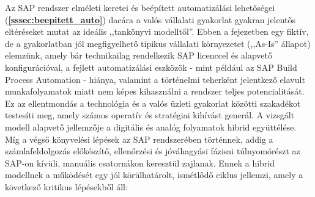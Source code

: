 Az SAP rendszer elméleti keretei és beépített automatizálási lehetőségei (\textbf{\ref{sssec:beepitett_auto}}) dacára a valós vállalati gyakorlat gyakran jelentős eltéréseket mutat az ideális ,,tankönyvi modelltől''.
Ebben a fejezetben egy fiktív, de a gyakorlatban jól megfigyelhető tipikus vállalati környezetet (,,As-Is'' állapot) elemzünk, amely bár technikailag rendelkezik SAP licenccel és alapvető konfigurációval, a fejlett automatizálási eszközök - mint például az SAP Build Process Automation - hiánya, valamint a történelmi teherként jelentkező elavult munkafolyamatok miatt nem képes kihasználni a rendszer teljes potencialitását.
Ez az ellentmondás a technológia és a valós üzleti gyakorlat közötti szakadékot testesíti meg, amely számos operatív és stratégiai kihívást generál.
A vizsgált modell alapvető jellemzője a digitális és analóg folyamatok hibrid együttélése.
Míg a végső könyvelési lépések az SAP rendszerében történnek, addig a számlafeldolgozás előkészítő, ellenőrzési és jóváhagyási fázisai túlnyomórészt az SAP-on kívüli, manuális csatornákon keresztül zajlanak.
Ennek a hibrid modellnek a működését egy jól körülhatárolt, ismétlődő ciklus jellemzi, amely a következő kritikus lépésekből áll:

